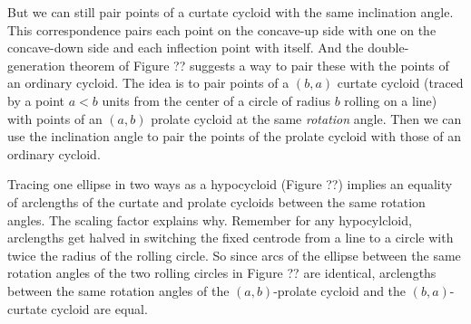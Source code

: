 \documentclass{ximera}
\begin{document}
But we can still pair points of a curtate cycloid with the same inclination angle. This correspondence pairs each point on the concave-up side with one on the concave-down side and each inflection point with itself. And the double-generation theorem of Figure ?? suggests a way to pair these with the points of an ordinary cycloid. The idea is to pair points of a $(b,a)$ curtate cycloid (traced by a point $a<b$ units from the center of a circle of radius $b$ rolling on a line) with points of an $(a,b)$ prolate cycloid at the same \emph{rotation} angle. Then we can use the inclination angle to pair the points of the prolate cycloid with those of an ordinary cycloid.


Tracing one ellipse in two ways as a hypocycloid (Figure ??)  implies an equality of arclengths of the curtate and prolate cycloids between the same rotation angles. The scaling factor explains why.  Remember for any hypocylcloid, arclengths get halved in switching the fixed centrode from a line to a circle with twice the radius of the rolling circle. So since arcs of the ellipse between the same rotation angles of the two rolling circles in Figure ?? are identical, arclengths between the same rotation angles of the $(a,b)$-prolate cycloid and the $(b,a)$-curtate cycloid are equal. 


\end{document}
